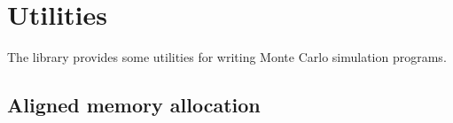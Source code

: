%
%
%
%

\chapter{Utilities}
\label{chap:Utilities}

The library provides some utilities for writing Monte Carlo simulation
programs.

\section{Aligned memory allocation}
\label{sec:Aligned memory allocation}

